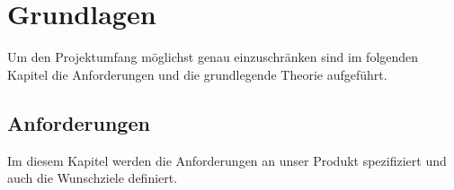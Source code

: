 \section{Grundlagen}
Um den Projektumfang möglichst genau einzuschränken sind im folgenden Kapitel die Anforderungen und die grundlegende Theorie aufgeführt.
\subsection{Anforderungen}
\label{Anforderungen}
Im diesem Kapitel werden die Anforderungen an unser Produkt spezifiziert und auch die Wunschziele definiert.
%
